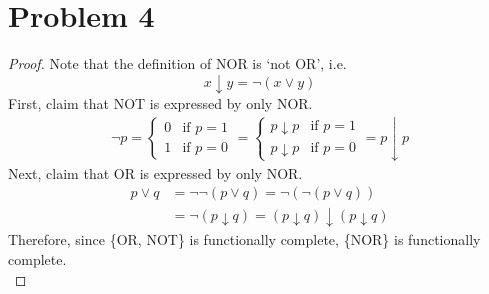 \section*{Problem 4}
	\begin{proof}
		Note that the definition of NOR is `not OR', i.e.
		\begin{equation*}
			x\downarrow y = \neg(x\vee y)
		\end{equation*}
		First, claim that NOT is expressed by only NOR.
		\begin{align*}
			\neg p=
			\begin{cases}
				0 & \mbox{if }p=1 \\
				1 & \mbox{if }p=0
			\end{cases} =
			\begin{cases}
				p\downarrow p & \mbox{if }p=1 \\
				p\downarrow p & \mbox{if }p=0
			\end{cases}
			= p\downarrow p
		\end{align*}
		Next, claim that OR is expressed by only NOR.
		\begin{align*}
			p\vee q &= \neg\neg(p\vee q) = \neg(\neg(p\vee q))\\
			&= \neg(p\downarrow q) = (p\downarrow q)\downarrow(p\downarrow q)
		\end{align*}
		Therefore, since \{OR, NOT\} is functionally complete, \{NOR\} is functionally complete.\\
	\end{proof}